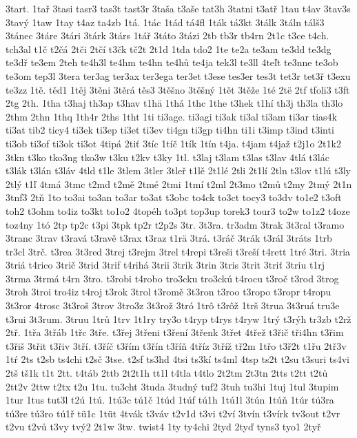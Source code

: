 {3tart.
1tař
3tasi
tasr3
tas3t
tast3r
3taša
t3aše
tat3h
3tatni
t3atř
1tau
t4av
3tav3s
3tavý
1taw
1tay
t4az
ta4zb
1tá.
1tác
1tád
tá4fl
1ták
tá3kt
3tálk
3táln
tálš3
3tánec
3táre
3tári
3tárk
3társ
1tář
3táto
3tázi
2tb
tb3r
tb4rn
2t1c
t3ce
t4ch.
tch3al
t1č
t2čá
2tči
2tčí
t3čk
tč2t
2t1d
1tda
tdo2
1te
te2a
te3am
te3dd
te3dg
te3dř
te3em
2teh
te4h3l
te4hm
te4hn
te4hů
te4ja
tek3l
te3ll
4teľt
te3nne
te3ob
te3om
tep3l
3tera
ter3ag
ter3ax
ter3ega
ter3et
t3ese
tes3er
tes3t
tet3r
tet3ř
t3exu
te3zz
1tě.
těd1
1těj
3těni
3těrá
těs3
3těšno
3těšný
1tět
3těže
1té
2të
2tf
tfoli3
t3ft
2tg
2th.
1tha
t3haj
th3ap
t3hav
t1hä
1thá
1thc
1the
t3hek
t1hí
th3j
th3la
th3lo
2thm
2thn
1thq
1th4r
2ths
1tht
1ti
ti3age.
ti3agi
ti3ak
ti3al
ti3am
ti3ar
tias4k
ti3at
tib2
ticy4
ti3ek
ti3ep
ti3et
ti3ev
ti4gn
ti3gp
ti4hn
ti1i
t3imp
t3ind
t3inti
ti3ob
ti3of
ti3ok
ti3ot
4tipá
2tiť
3tíc
1tíč
1tík
1tín
t4ja.
t4jam
t4jaž
t2j1o
2t1k2
3tkn
t3ko
tko3ng
tko3w
t3ku
t2kv
t3ky
1tl.
t3laj
t3lam
t3las
t3lav
4tlá
t3lác
t3lák
t3lán
t3láv
4tld
t1le
3tlem
3tler
3tleř
t1lě
2t1lé
2tli
2t1lí
2tln
t3lov
t1lú
t3ly
2tlý
t1ľ
4tmá
3tmc
t2md
t2mě
2tmé
2tmi
1tmí
t2ml
2t3mo
t2mů
t2my
2tmý
2t1n
3tnf3
2tň
1to
to3ai
to3an
to3ar
to3at
t3obc
to4ck
to3ct
tocy3
to3dv
to1e2
t3oft
toh2
t3ohm
to4iz
to3kt
to1o2
4topéh
to3pt
top3up
torek3
tour3
to2w
to1z2
t4oze
toz4ny
1tó
2tp
tp2c
t3pi
3tpk
tp2r
t2p2s
3tr.
3t3ra.
tr3adm
3trak
3t3ral
t3ramo
3tranc
3trav
t3ravá
t3ravě
t3rax
t3raz
t1rä
3trá.
t3ráč
3trák
t3rál
3tráts
1trb
tr3cl
3trč.
t3rea
3t3red
3trej
t3rejm
3trel
t4repi
t3reši
t3reší
t4rett
1tré
3tri.
3tria
3triá
t4rico
3trič
3trid
3trif
t4rihá
3trii
3trik
3trin
3tris
3trit
3triť
3triu
t1rj
3trma
3trmá
t4rn
3tro.
t3robi
t4robo
tro3cku
tro3ckú
t4rocu
t3roč
t3rod
3trog
3troh
3troi
tro4iz
t4roj
t3rok
3trol
t3romě
3t3ron
t3roo
t3ropo
t3ropr
t4ropu
3t3ror
4trosc
3t3roš
3trov
3tro3z
3t3rož
3tró
1trô
t3rôž
1trš
3trua
3t3ruá
tru3e
t3rui
3t3rum.
3truu
1trů
1trv
1t1ry
try3o
t4ryp
t4rys
t4ryw
1trý
t3rýh
tr3zb
t2rž
2tř.
1třa
3třáb
1třc
3tře.
t3řej
3třeni
t3ření
3třenk
3třet
4třež
t3řič
tři4hn
t3řim
t3řiš
3třit
t3řiv
3tří.
t3říč
t3řím
t3řín
t3říň
4tříz
3tříž
tř2m
1třo
t3ř2t
t1řu
2tř3v
1tŕ
2ts
t2sb
ts4chi
t2sč
3tse.
t2sf
ts3hd
4tsi
ts3kí
ts4ml
4tsp
ts2t
t2su
t3suri
ts4vi
2tš
tš1k
t1t
2tt.
t4táb
2ttb
2t2t1h
tt1l
t4tla
t4tlo
2t2tm
2t3tn
2tts
t2tt
t2tů
2tt2v
2ttw
t2tx
t2u
1tu.
tu3cht
3tuda
3tudný
tuf2
3tuh
tu3hi
1tuj
1tul
3tupim
1tur
1tus
tut3l
t2ú
1tú.
1tú3c
tú1č
1túd
1túf
tú1h
1tú1l
3tún
1túň
1túr
tú3ra
tú3re
tú3ro
tú1ř
tü1c
1tüt
4tvák
t3váv
t2v1d
t3vi
t2ví
3tvín
t3vírk
tv3out
t2vr
t2vu
t2vů
t3vy
tvý2
2t1w
3tw.
twist4
1ty
ty4chi
2tyd
2tyď
tyns3
tyo1
2tyř
}
